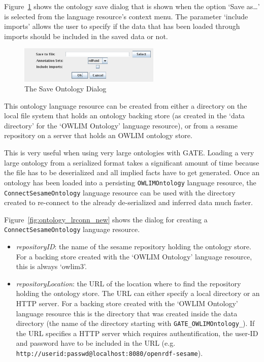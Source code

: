 Figure~\ref{fig:ontology_lr_save} shows the ontology save 
dialog that is shown when the option `Save as\dots' is selected from
the language resource's context menu. 
The parameter `include imports' allows the user to specify if the data 
that has been loaded through imports should be included in the saved data or not.

\begin{figure}[!htbp]
\begin{center}
\includegraphics[width=0.6\textwidth]{ontology_lr_save.png}
\caption{The Save Ontology Dialog}
\label{fig:ontology_lr_save}
\end{center}
\end{figure}



This ontology language resource can be created from either 
a directory on the local file system that holds an ontology backing store
(as created in the `data directory' for the `OWLIM Ontology' language resource),
or from a sesame repository on a server that holds an OWLIM ontology 
store.

This is very useful when using very large ontologies with GATE. Loading a 
very large ontology from a serialized format takes a significant amount
of time because the file has to be deserialized and all implied facts
have to get generated. Once an ontology has been loaded into a persisting
\texttt{OWLIMOntology} language resource, the \texttt{ConnectSesameOntology} language resource can
be used with the directory created to re-connect to the already de-serialized
and inferred data much faster.

Figure~\ref{fig:ontology_lrconn_new} shows the dialog for creating a
\texttt{ConnectSesameOntology} language resource.
\begin{itemize}
 \item \emph{repositoryID}: the name of the sesame repository holding the ontology store.
 For a backing store created with the `OWLIM Ontology' language resource, this
 is always `owlim3'. 
 \item \emph{repositoryLocation}: the URL of the location where to find the repository
 holding the ontology store. The URL can either specify a local directory or 
 an HTTP server. For a backing store created with the `OWLIM Ontology'
 language resource this is the directory that was created inside the data directory
 (the name of the directory starting with \verb!GATE_OWLIMOntology_!). 
 If the URL specifies a HTTP server which requires authentification, the user-ID
 and password have to be included in the URL (e.g. \verb!http://userid:passwd@localhost:8080/openrdf-sesame!).

\end{itemize}

